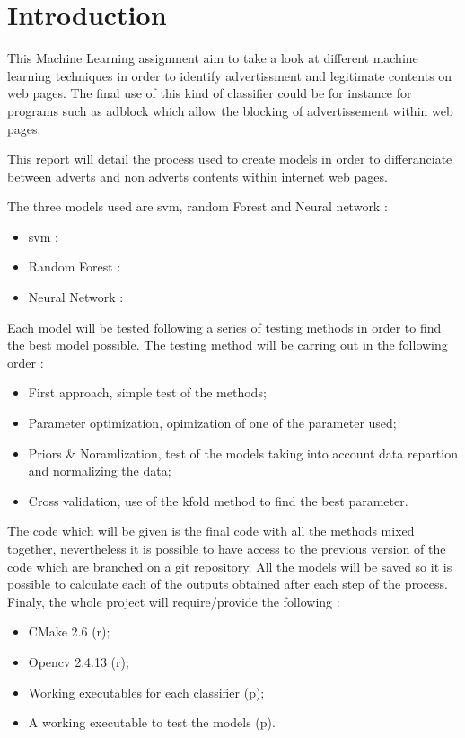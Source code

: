 \section{Introduction}

This Machine Learning assignment aim to take a look at different machine learning techniques in order to identify advertissment and legitimate contents on web pages. The final use of this kind of classifier could be for instance for programs such as adblock which allow the blocking of advertissement within web pages.

This report will detail the process used to create models in order to differanciate between adverts and non adverts contents within internet web pages.

The three models used are svm, random Forest and Neural network :
\begin{itemize}
  \item svm :
  \item Random Forest :
  \item Neural Network :
\end{itemize}
\vspace{\baselineskip}

Each model will be tested following a series of testing methods in order to find the best model possible.
The testing method will be carring out in the following order :
\begin{itemize}
  \item First approach, simple test of the methods;
  \item Parameter optimization, opimization of one of the parameter used;
  \item Priors \& Noramlization, test of the models taking into account data repartion and normalizing the data;
  \item Cross validation, use of the kfold method to find the best parameter.
\end{itemize}
\vspace{\baselineskip}

The code which will be given is the final code with all the methods mixed together, nevertheless it is possible to have access to the previous version of the code which are branched on a git repository. All the models will be saved so it is possible to calculate each of the outputs obtained after each step of the process. Finaly, the whole project will require/provide the following :
\begin{itemize}
  \item CMake 2.6 (r);
  \item Opencv 2.4.13 (r);
  \item Working executables for each classifier (p);
  \item A working executable to test the models (p).
\end{itemize}
